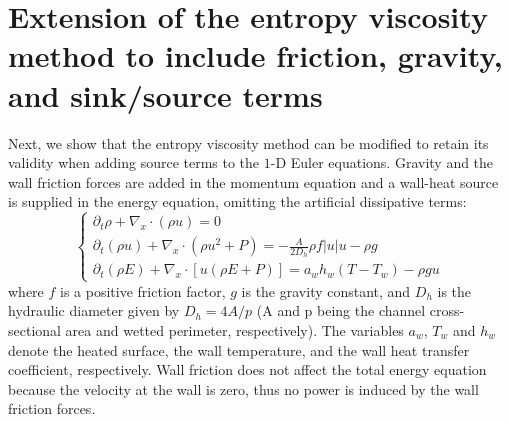 \documentclass[12pt]{article}
\begin{document}
%
\section{Extension of the entropy viscosity method to include friction, gravity, and sink/source terms}
\label{sec:ext}

Next, we show that the entropy viscosity method can be modified to retain its validity when adding source terms to the $1$-D Euler equations. Gravity and the wall friction forces are added in the momentum equation and a wall-heat source is supplied in the energy equation, omitting the artificial dissipative terms:
\begin{equation}
\label{eq:equation19}
\left\{
\begin{array}{lll}
\partial_t \rho + \nabla_x  \cdot \left( \rho u \right) = 0 \\
\partial_t \left( \rho u \right) + \nabla_x \cdot \left( \rho u^2 + P \right) =  - \frac{A}{2 D_h} \rho f |u| u - \rho g \\
\partial_t \left( \rho E \right) + \nabla_x \cdot \left[ u  \left( \rho E + P \right) \right] = a_w h_w \left( T - T_w \right) - \rho g u
\end{array}
\right.
\end{equation}
where $f$ is a positive friction factor, $g$ is the gravity constant, and $D_h$ is the hydraulic diameter given by $D_h = 4A/p$ (A and p being the channel cross-sectional area and wetted perimeter, respectively). The variables $a_w$, $T_w$ and $h_w$ denote the heated surface, the wall temperature, and the wall heat transfer coefficient, respectively.
Wall friction does not affect the total energy equation because  the velocity at the wall is zero, thus no power is induced by the wall friction forces. 
\end{document}
